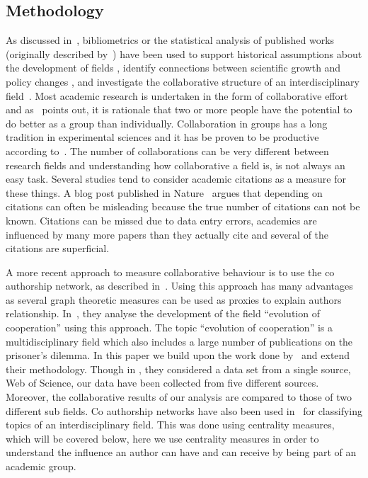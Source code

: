 \documentclass{article}
\theoremstyle{definition}
\begin{document}
\subsection{Methodology}\label{section:methodology}

As discussed in~\cite{youngblood2018}, bibliometrics or the statistical analysis
of published works (originally described by~\cite{pritchard1969}) 
have been used to support historical assumptions about the development of fields
\cite{raina1998}, identify connections between scientific growth and policy changes 
\cite{das2016}, and investigate the collaborative structure of an interdisciplinary
field~\cite{Liu2015}.
Most academic research is undertaken in the form of collaborative effort and as~\cite{Kyvik2017}
points out, it is rationale that two or more people have the potential to do better
as a group than individually. Collaboration in groups has a long tradition in experimental 
sciences and it has be proven to be productive according to~\cite{Etzkowitz1992}.
The number of collaborations can be very different between research fields and
understanding how collaborative a field is, is not always an easy task.
Several studies tend to consider academic citations as a measure for these things.
A blog post published in Nature~\cite{nature_blog} argues that depending on citations
can often be misleading because the true number of citations can not be
known. Citations can be missed due to data entry errors, academics are influenced
by many more papers than they actually cite and several of the citations are
superficial.

A more recent approach to measure collaborative behaviour is to use the co
authorship network, as described in~\cite{Liu2015}. Using this approach has many
advantages as several graph theoretic measures can be used as proxies to explain
authors relationship. In~\cite{Liu2015}, they analyse the development of the field
``evolution of cooperation'' using this approach. The topic ``evolution of cooperation''
is a multidisciplinary field which also includes a large number of publications
on the prisoner's dilemma. In this paper we build upon
the work done by~\cite{Liu2015} and extend their methodology. Though in
\cite{Liu2015}, they considered a data set from a single source, Web of Science,
our data have been collected from five different sources. Moreover, the collaborative
results of our analysis are compared to those of two different sub fields.
Co authorship networks have also been used in~\cite{youngblood2018} for classifying
topics of an interdisciplinary field. This was done using centrality measures,
which will be covered below, here we use centrality measures in order to understand
the influence an author can have and can receive by being part of an academic group.
\end{document}
